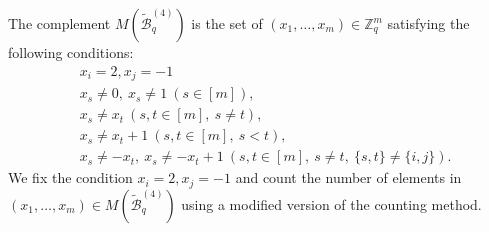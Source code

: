 \documentclass{article}
\theoremstyle{plain}
\theoremstyle{definition}
\theoremstyle{remark}
\numberwithin{equation}{section}
\newcommand{\ZZ}{\mathbb{Z}}
\begin{document}
\bigskip

The complement $M(\mathcal{\widetilde{B}}_q^{(4)})$ is the set of $(x_1,\dots,x_m)\in\ZZ_q^m$ satisfying the following conditions:
\begin{align*}
&x_i=2, x_j = -1\\
&x_s\neq 0,\ x_s\neq 1\ (s\in [m]),\\
&x_s\neq x_t\ (s,t\in [m],\ s\neq t),\\
&x_s\neq x_t+1\ (s,t\in [m],\ s<t),\\
&x_s\neq -x_t,\ x_s\neq -x_t+1\ (s,t\in [m],\ s\neq t,\ \{s,t\}\neq \{i,j\}).
\end{align*}
We fix the condition $x_i=2, x_j = -1$ and count the number of elements in $(x_1,\dots,x_m)\in M(\mathcal{\widetilde{B}}^{(4)}_q)$ using a modified version of the counting method. %
\end{document}
